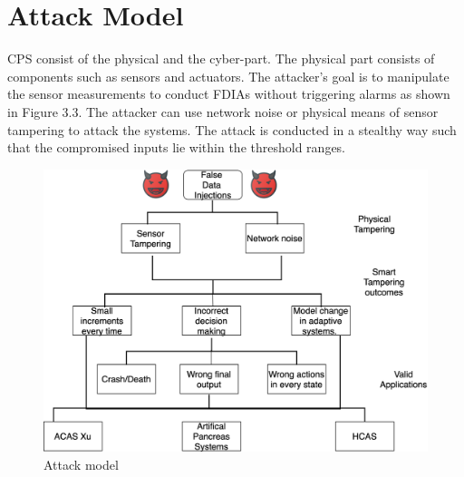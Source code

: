 \section{Attack Model}
CPS consist of the physical and the cyber-part. The physical part consists of components such as sensors and actuators. The attacker's goal is to manipulate the sensor measurements to conduct FDIAs without triggering alarms as shown in Figure 3.3. The attacker can use network noise or physical means of sensor tampering to attack the systems. 
The attack is conducted in a stealthy way such that the compromised inputs lie within the threshold ranges. 
\begin{figure}
	\centering
	\includegraphics[width=0.7\linewidth]{Images/Attackmodelphysical}
	\caption{Attack model}
	\label{fig:attackmodelphysical}
\end{figure}

